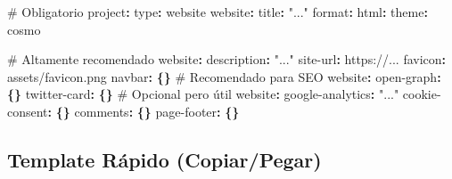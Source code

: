 \documentclass[
  doc,
  floatsintext,
  longtable,
  a4paper,
  nolmodern,
  notxfonts,
  notimes,
  12pt,
  colorlinks=true,linkcolor=blue,citecolor=blue,urlcolor=blue]{apa7}
\newenvironment{Shaded}{\begin{snugshade}}{\end{snugshade}}
\newcommand{\AttributeTok}[1]{\textcolor[rgb]{0.40,0.45,0.13}{#1}}
\newcommand{\CommentTok}[1]{\textcolor[rgb]{0.37,0.37,0.37}{#1}}
\newcommand{\FunctionTok}[1]{\textcolor[rgb]{0.28,0.35,0.67}{#1}}
\newcommand{\KeywordTok}[1]{\textcolor[rgb]{0.00,0.23,0.31}{\textbf{#1}}}
\newcommand{\StringTok}[1]{\textcolor[rgb]{0.13,0.47,0.30}{#1}}
\begin{document}
\begin{Shaded}
\begin{Highlighting}[]
\CommentTok{\# Obligatorio}
\FunctionTok{project}\KeywordTok{:}
\AttributeTok{  }\FunctionTok{type}\KeywordTok{:}\AttributeTok{ website}
\AttributeTok{  }
\FunctionTok{website}\KeywordTok{:}
\AttributeTok{  }\FunctionTok{title}\KeywordTok{:}\AttributeTok{ }\StringTok{"..."}
\AttributeTok{  }
\FunctionTok{format}\KeywordTok{:}
\AttributeTok{  }\FunctionTok{html}\KeywordTok{:}
\AttributeTok{    }\FunctionTok{theme}\KeywordTok{:}\AttributeTok{ cosmo}

\CommentTok{\# Altamente recomendado}
\FunctionTok{website}\KeywordTok{:}
\AttributeTok{  }\FunctionTok{description}\KeywordTok{:}\AttributeTok{ }\StringTok{"..."}
\AttributeTok{  }\FunctionTok{site{-}url}\KeywordTok{:}\AttributeTok{ https://...}
\AttributeTok{  }\FunctionTok{favicon}\KeywordTok{:}\AttributeTok{ assets/favicon.png}
\AttributeTok{  }\FunctionTok{navbar}\KeywordTok{:}\AttributeTok{ }\KeywordTok{\{\}}
\AttributeTok{  }
\CommentTok{\# Recomendado para SEO}
\FunctionTok{website}\KeywordTok{:}
\AttributeTok{  }\FunctionTok{open{-}graph}\KeywordTok{:}\AttributeTok{ }\KeywordTok{\{\}}
\AttributeTok{  }\FunctionTok{twitter{-}card}\KeywordTok{:}\AttributeTok{ }\KeywordTok{\{\}}
\AttributeTok{  }
\CommentTok{\# Opcional pero útil}
\FunctionTok{website}\KeywordTok{:}
\AttributeTok{  }\FunctionTok{google{-}analytics}\KeywordTok{:}\AttributeTok{ }\StringTok{"..."}
\AttributeTok{  }\FunctionTok{cookie{-}consent}\KeywordTok{:}\AttributeTok{ }\KeywordTok{\{\}}
\AttributeTok{  }\FunctionTok{comments}\KeywordTok{:}\AttributeTok{ }\KeywordTok{\{\}}
\AttributeTok{  }\FunctionTok{page{-}footer}\KeywordTok{:}\AttributeTok{ }\KeywordTok{\{\}}
\end{Highlighting}
\end{Shaded}

\subsection{Template Rápido
(Copiar/Pegar)}\label{template-ruxe1pido-copiarpegar}
\end{document}
